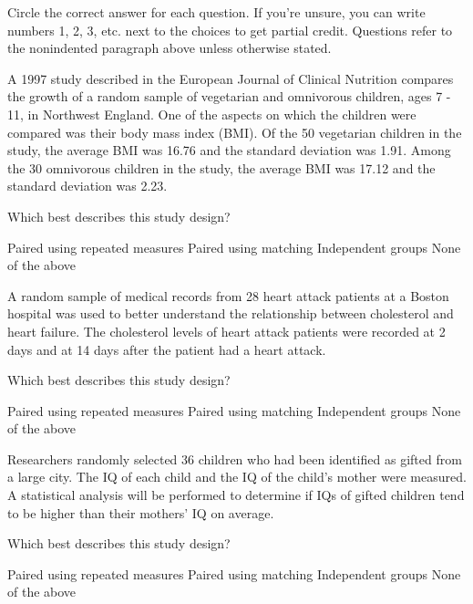 \documentclass{article}
\begin{document}
	Circle the correct answer for each question.  If you're unsure, you can write numbers 1, 2, 3, etc. next to the choices to get partial credit.  Questions refer to the nonindented paragraph above unless otherwise stated.\\[.5cm]
	
	\begin{mcquestions}
		\question A 1997 study described in the European Journal of Clinical Nutrition compares the growth of a random sample of vegetarian and omnivorous children, ages 7 - 11, in Northwest England. One of the aspects on which the children were compared was their body mass index (BMI). Of the 50 vegetarian children in the study, the average BMI was 16.76 and the standard deviation was 1.91. Among the 30 omnivorous children in the study, the average BMI was 17.12 and the standard deviation was 2.23.
		
		Which best describes this study design?
		\begin{mcanswerslist}
			\answer Paired using repeated measures
			\answer Paired using matching
			\answer[correct] Independent groups
			\answer None of the above
		\end{mcanswerslist}
		
		\question A random sample of medical records from 28 heart attack patients at a Boston hospital was used to better understand the relationship between cholesterol and heart failure.  The cholesterol levels of heart attack patients were recorded at 2 days and at 14 days after the patient had a heart attack.
		
		Which best describes this study design?
		\begin{mcanswerslist}
			\answer[correct] Paired using repeated measures
			\answer Paired using matching
			\answer Independent groups
			\answer None of the above
		\end{mcanswerslist}
		
		\question Researchers randomly selected 36 children who had been identified as gifted from a large city. The IQ of each child and the IQ of the child's mother were measured. A statistical analysis will be performed to determine if IQs of gifted children tend to be higher than their mothers' IQ on average.
		
		Which best describes this study design?
		
		\begin{mcanswerslist}
			\answer Paired using repeated measures
			\answer[correct] Paired using matching
			\answer Independent groups
			\answer None of the above
		\end{mcanswerslist}
		

\end{mcquestions}
\end{document}
